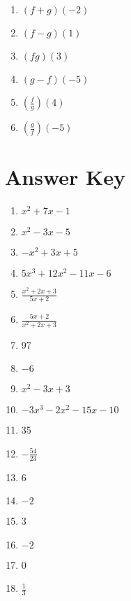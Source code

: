 \begin{multicols}{6}
\begin{enumerate}	\setcounter{enumi}{\value{Review}}
	\item $(f + g)(-2)$
	\item $(f - g)(1)$
	\item $(fg)(3)$
	\item $(g - f)(-5)$
	\item $\left(\frac{f}{g}\right)(4)$
	\item $\left(\frac{g}{f}\right)(-5)$
\end{enumerate}	\setcounter{Review}{\value{enumi}}
\end{multicols}

\newpage

\section{Answer Key}

\begin{enumerate}
	\item $x^2+7x-1$
    \item $x^2-3x-5$
    \item $-x^2+3x+5$
    \item $5x^3+12x^2-11x-6$
    \item $\frac{x^2+2x+3}{5x+2}$
    \item $\frac{5x+2}{x^2+2x+3}$
    \item 97
    \item $-6$
    \item $x^2-3x+3$
    \item $-3x^3-2x^2-15x-10$
    \item 35
    \item $-\frac{54}{23}$
    \item 6
    \item $-2$
    \item 3
    \item $-2$
    \item 0
    \item $\frac{1}{3}$
\end{enumerate}